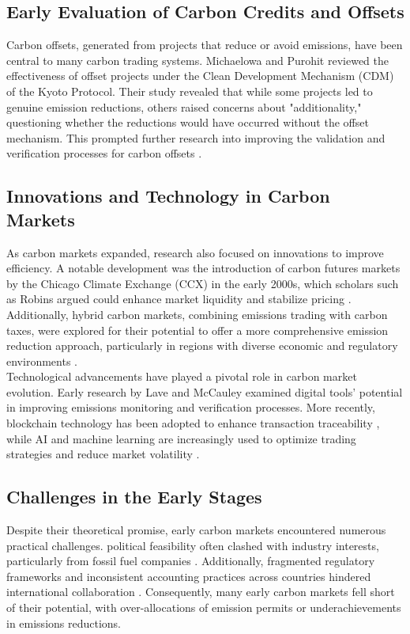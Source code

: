 \documentclass[preprint,12pt]{elsarticle}
\begin{document}
\subsection{Early Evaluation of Carbon Credits and Offsets}
Carbon offsets, generated from projects that reduce or avoid emissions, have been central to many carbon trading systems. Michaelowa and Purohit \citep{ref14} reviewed the effectiveness of offset projects under the Clean Development Mechanism (CDM) of the Kyoto Protocol. Their study revealed that while some projects led to genuine emission reductions, others raised concerns about "additionality," questioning whether the reductions would have occurred without the offset mechanism. This prompted further research into improving the validation and verification processes for carbon offsets \citep{ref15}.
\subsection{Innovations and Technology in Carbon Markets}
As carbon markets expanded, research also focused on innovations to improve efficiency. A notable development was the introduction of carbon futures markets by the Chicago Climate Exchange (CCX) in the early 2000s, which scholars such as Robins argued could enhance market liquidity and stabilize pricing \citep{ref16}. Additionally, hybrid carbon markets, combining emissions trading with carbon taxes, were explored for their potential to offer a more comprehensive emission reduction approach, particularly in regions with diverse economic and regulatory environments \citep{zhang2020ai}.\\
Technological advancements have played a pivotal role in carbon market evolution. Early research by Lave and McCauley \citep{Gao2022predicting} examined digital tools’ potential in improving emissions monitoring and verification processes. More recently, blockchain technology has been adopted to enhance transaction traceability \citep{Cheng2021ai}, while AI and machine learning are increasingly used to optimize trading strategies and reduce market volatility \citep{zhao2021optimizing}.
\subsection{Challenges in the Early Stages}
Despite their theoretical promise, early carbon markets encountered numerous practical challenges. political feasibility often clashed with industry interests, particularly from fossil fuel companies\citep{xu2020enhancing} . Additionally, fragmented regulatory frameworks and inconsistent accounting practices across countries hindered international collaboration \citep{chen2021fraud}. Consequently, many early carbon markets fell short of their potential, with over-allocations of emission permits or underachievements in emissions reductions.
\end{document}
